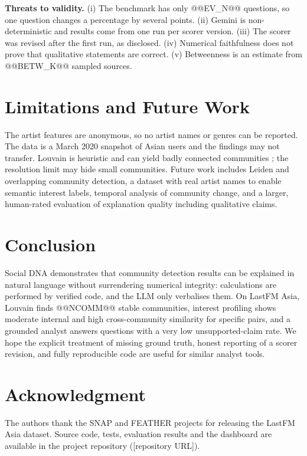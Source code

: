 \documentclass[conference]{IEEEtran}
\begin{document}
\textbf{Threats to validity.} (i) The benchmark has only @@EV_N@@ questions, so one question changes a percentage by several points. (ii) Gemini is non-deterministic and results come from one run per scorer version. (iii) The scorer was revised after the first run, as disclosed. (iv) Numerical faithfulness does not prove that qualitative statements are correct. (v) Betweenness is an estimate from @@BETW_K@@ sampled sources.

\section{Limitations and Future Work}
The artist features are anonymous, so no artist names or genres can be reported. The data is a March 2020 snapshot of Asian users and the findings may not transfer. Louvain is heuristic and can yield badly connected communities \cite{traag2019}; the resolution limit \cite{fortunato2007} may hide small communities. Future work includes Leiden and overlapping community detection, a dataset with real artist names to enable semantic interest labels, temporal analysis of community change, and a larger, human-rated evaluation of explanation quality including qualitative claims.

\section{Conclusion}\label{sec:conc}
Social DNA demonstrates that community detection results can be explained in natural language without surrendering numerical integrity: calculations are performed by verified code, and the LLM only verbalises them. On LastFM Asia, Louvain finds @@NCOMM@@ stable communities, interest profiling shows moderate internal and high cross-community similarity for specific pairs, and a grounded analyst answers questions with a very low unsupported-claim rate. We hope the explicit treatment of missing ground truth, honest reporting of a scorer revision, and fully reproducible code are useful for similar analyst tools.

\section*{Acknowledgment}
The authors thank the SNAP and FEATHER projects for releasing the LastFM Asia dataset. Source code, tests, evaluation results and the dashboard are available in the project repository ({[}repository URL{]}).
\end{document}
